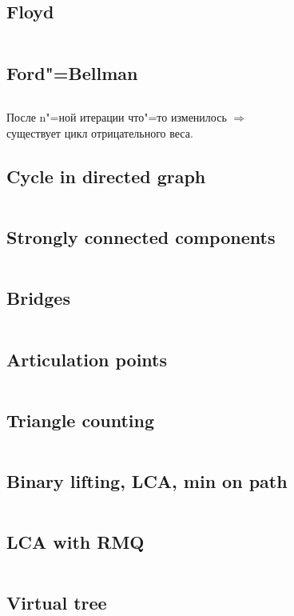 ﻿\documentclass[10pt,twocolumn,oneside]{article}
\begin{document}
\subsection{Floyd}
\inputminted[breaklines]{cpp}{Graph algorithms/floyd.cpp}
\subsection{Ford"=Bellman}
\inputminted[breaklines]{python}{Graph algorithms/ford-bellman.py}
После n"=ной итерации что"=то изменилось $\Rightarrow$ \\
существует цикл отрицательного веса.
\subsection{Cycle in directed graph}
\inputminted[breaklines]{cpp}{Graph algorithms/cycle in directed graph.cpp}
\subsection{Strongly connected components}
\inputminted[breaklines]{cpp}{Graph algorithms/strongly connected components.cpp}
\subsection{Bridges}
\inputminted[breaklines]{cpp}{Graph algorithms/bridges.cpp}
\subsection{Articulation points}
\inputminted[breaklines]{cpp}{Graph algorithms/articulation points.cpp}
\subsection{Triangle counting}
\inputminted[breaklines]{cpp}{Graph algorithms/triangles.cpp}
\subsection{Binary lifting, LCA, min on path}
\inputminted[breaklines]{cpp}{Graph algorithms/binary lifting + lca + min on path.cpp}
\subsection{LCA with RMQ}
\inputminted[breaklines]{cpp}{Graph algorithms/lca with rmq.cpp}
\subsection{Virtual tree}
\inputminted[breaklines]{cpp}{Graph algorithms/virtual tree.cpp}
\end{document}

